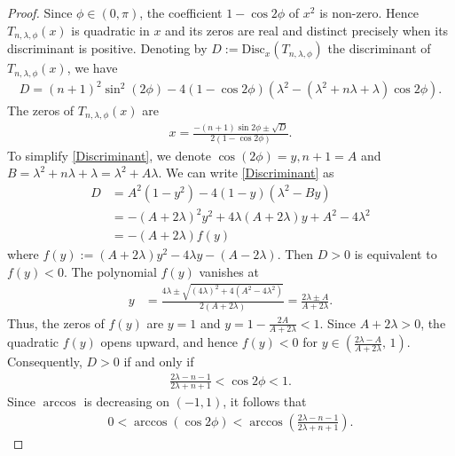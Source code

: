 \documentclass[final,3p,times,12pt]{elsarticle}
\numberwithin{equation}{section}  %
\begin{document}
	\begin{proof}
		Since $\phi\in(0,\pi)$, the coefficient $1-\cos 2\phi$ of $x^2$ is non-zero. Hence $T_{n,\lambda,\phi}(x)$ is quadratic in $x$ and its zeros are real and distinct precisely when its discriminant is positive.  Denoting by
		$D := \mathrm{Disc}_x\!\left(T_{n,\lambda,\phi}\right)$
		the discriminant of $T_{n,\lambda,\phi}(x)$, we have
		\begin{align}\label{Discriminant}
			D=(n+1)^2\sin^2(2\phi)-4(1-\cos2\phi)(\lambda^2-(\lambda^2+n\lambda+\lambda)\cos2\phi).
		\end{align}
		The zeros of $T_{n,\lambda,\phi}(x)$ are 
		\begin{align*}
			x=\frac{-(n+1)\sin2\phi \pm \sqrt{D}}{2(1-\cos2\phi)}.
		\end{align*}
		To simplify \eqref{Discriminant}, we denote $\cos(2\phi)=y, n+1=A$ and $B=\lambda^2+n \lambda+\lambda=\lambda^2+A\lambda$. We can write \eqref{Discriminant} as
		\begin{align}
			\nonumber	D&=A^2(1-y^2)-4(1-y)(\lambda^2-By)\\
			\nonumber	&=-(A+2\lambda)^2y^2+4\lambda(A+2\lambda)y+A^2-4\lambda^2\\
			\nonumber	&=-(A+2\lambda)f(y)
		\end{align}
        where $f(y):= (A+2\lambda)y^2-4\lambda y-(A-2\lambda)$.	 Then $D>0$ is equivalent to $f(y)<0$. The polynomial $f(y)$ vanishes at
		\begin{align*}
			y &= \frac{4\lambda \pm \sqrt{(4\lambda)^2 + 4(A^2 - 4\lambda^2)}}{2(A+2\lambda)}
			= \frac{2\lambda \pm A}{A+2\lambda}.
		\end{align*}
		Thus, the zeros of $f(y)$ are $y=1$ and
		$y=1-\frac{2A}{A+2\lambda}<1$.
		Since $A+2\lambda>0$, the quadratic $f(y)$ opens upward, and hence
		$f(y)<0$ for $	y \in \left(\frac{2\lambda-A}{A+2\lambda},\,1\right).$
		Consequently, $D>0$ if and only if
		\begin{align*}
			\frac{2\lambda-n-1}{2\lambda+n+1}
			< \cos 2\phi < 1.
		\end{align*}
		Since  $\arccos$ is decreasing on $(-1,1)$, it follows that
		\begin{align*}
			0 < \arccos(\cos 2\phi)
			< \arccos\!\left(\frac{2\lambda-n-1}{2\lambda+n+1}\right).

\end{align*}
\end{proof}
\end{document}
